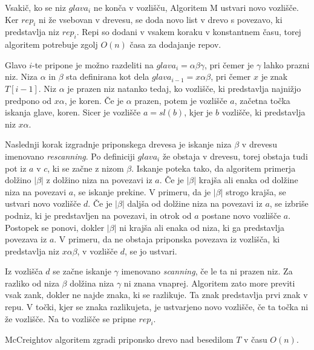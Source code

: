 Vsakič, ko se niz $glava_i$ ne konča v vozlišču, Algoritem M ustvari novo vozlišče. Ker $rep_i$ ni že vsebovan v drevesu, se doda novo list v drevo s povezavo, ki predstavlja niz $rep_i$. Repi so dodani v vsakem koraku v konstantnem času, torej algoritem potrebuje zgolj $O(n)$ časa za dodajanje repov.

Glavo $i$-te pripone je možno razdeliti na $glava_i = \alpha\beta\gamma$, pri čemer je $\gamma$ lahko prazni niz. Niza $\alpha$ in $ \beta$ sta definirana kot dela $glava_{i-1} = x\alpha\beta$, pri čemer $x$ je znak $T[i-1]$. Niz $\alpha$ je prazen niz natanko tedaj, ko vozlišče, ki predstavlja najnižjo predpono od $x\alpha$, je koren. Če je $\alpha$ prazen, potem je vozlišče $a$, začetna točka iskanja glave, koren. Sicer je vozlišče $a=sl(b)$, kjer je $b$ vozlišče, ki predstavlja niz $x\alpha$.

Naslednji korak izgradnje priponskega drevesa je iskanje niza $\beta$ v drevesu imenovano \textit{rescanning}. Po definiciji $glava_i$ že obstaja v drevesu, torej obstaja tudi pot iz $a$ v $c$, ki se začne z nizom $\beta$. Iskanje poteka tako, da algoritem primerja dolžino $|\beta|$ z dolžino niza na povezavi iz $a$. Če je $|\beta|$ krajša ali enaka od dolžine niza na povezavi $a$, se iskanje prekine. V primeru, da je $|\beta|$ strogo krajša, se ustvari novo vozlišče $d$. Če je $|\beta|$ daljša od dolžine niza na povezavi iz $a$, se izbriše podniz, ki je predstavljen na povezavi, in otrok od $a$ postane novo vozlišče $a$. Postopek se ponovi, dokler $|\beta|$ ni krajša ali enaka od niza, ki ga predstavlja povezava iz $a$. V primeru, da ne obstaja priponska povezava iz vozlišča, ki predstavlja niz $x\alpha\beta$, v vozlišče $d$, se jo ustvari.

Iz vozlišča $d$ se začne iskanje $\gamma$ imenovano \textit{scanning}, če le ta ni prazen niz. Za razliko od niza $\beta$ dolžina niza $\gamma$ ni znana vnaprej. Algoritem zato more previti vsak zank, dokler ne najde znaka, ki se razlikuje. Ta znak predstavlja prvi znak v repu. V točki, kjer se znaka razlikujeta, je ustvarjeno novo vozlišče, če ta točka ni že vozlišče. Na to vozlišče se pripne $rep_i$.


\begin{izr}
    McCreightov algoritem zgradi priponsko drevo nad besedilom $T$ v času $O(n)$.
\end{izr}

